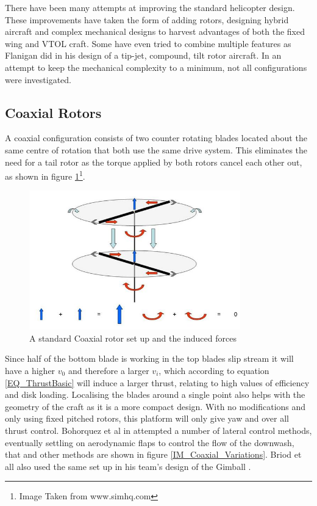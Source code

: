 There have been many attempts at improving the standard helicopter design. These improvements have taken the form of adding rotors, designing hybrid aircraft and complex mechanical designs to harvest advantages of both the fixed wing and VTOL craft. Some have even tried to combine multiple features as Flanigan \cite{US7147182} did in his design of a tip-jet, compound, tilt rotor aircraft. 
In an attempt to keep the mechanical complexity to a minimum, not all configurations were investigated.

\subsection{Coaxial Rotors}
A coaxial configuration consists of two counter rotating blades located about the same centre of rotation that both use the same drive system. This eliminates the need for a tail rotor as the torque applied by both rotors cancel each other out, as shown in figure \ref{IM_Coaxial}\footnote{Image Taken from www.simhq.com}.  

\begin{figure}[H]
\centering
\includegraphics[height = 6cm]{Images/Literature/Coaxial}     
\caption{A standard Coaxial rotor set up and the induced forces}
\label{IM_Coaxial}
\end{figure}

Since half of the bottom blade is working in the top blades slip stream it will have a higher $v_0$ and therefore a larger $v_i$, which according to equation \eqref{EQ_ThrustBasic} will induce a larger thrust, relating to high values of efficiency and disk loading. Localising the blades around a single point also helps with the geometry of the craft as it is a more compact design. With no modifications and only using fixed pitched rotors, this platform will only give yaw and over all thrust control. Bohorquez et al in \cite{Bohorquez} attempted a number of lateral control methods, eventually settling on aerodynamic flaps to control the flow of the downwash, that and other methods are shown in figure \ref{IM_Coaxial_Variations}. Briod et all also used the same set up in his team's design of the Gimball \cite{Briod2012}.
 
